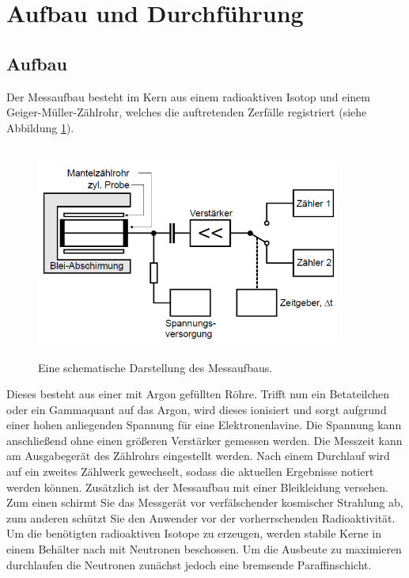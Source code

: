 \section{Aufbau und Durchführung}
\subsection{Aufbau}
Der Messaufbau besteht im Kern aus einem radioaktiven Isotop und einem
Geiger-Müller-Zählrohr, welches die auftretenden Zerfälle registriert (siehe Abbildung \ref{fig:aufbau}).
\begin{figure}[H]
\centering
\includegraphics[width = 10cm, height= 7cm]{Schematisch.png}
\caption{Eine schematische Darstellung des Messaufbaus. \cite{1}}
\label{fig:aufbau}
\end{figure}
\noindent  
Dieses besteht aus einer mit Argon 
gefüllten Röhre. Trifft nun ein Betateilchen oder ein Gammaquant auf das Argon, wird dieses ionisiert und 
sorgt aufgrund einer hohen anliegenden Spannung für eine Elektronenlavine. Die Spannung kann anschließend 
ohne einen größeren Verstärker gemessen werden. Die Messzeit kann am Ausgabegerät des Zählrohrs eingestellt
werden. Nach einem Durchlauf wird auf ein zweites Zählwerk gewechselt, sodass die aktuellen Ergebnisse notiert werden können. 
Zusätzlich ist der Messaufbau mit einer Bleikleidung versehen. Zum einen schirmt Sie das Messgerät 
vor verfälschender kosmischer Strahlung ab, zum anderen schützt Sie den Anwender vor der vorherrschenden 
Radioaktivität. Um die benötigten radioaktiven Isotope zu erzeugen, werden stabile Kerne in einem Behälter
nach mit Neutronen beschossen. Um die Ausbeute zu maximieren durchlaufen die Neutronen 
zunächst jedoch eine bremsende Paraffinschicht.
